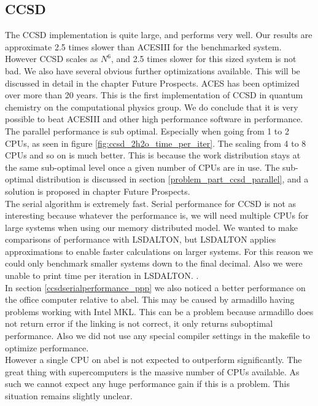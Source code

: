 \documentclass[a4paper,norsk,11pt,twoside]{report}
\begin{document}
\subsection{CCSD}
The CCSD implementation is quite large, and performs very well. Our results are approximate 2.5 times slower than ACESIII for the benchmarked system. However CCSD scales as $N^6$, and 2.5 times slower for this sized system is not bad. We also have several obvious further optimizations available. This will be discussed in detail in the chapter Future Prospects. ACES has been optimized over more than 20 years. This is the first implementation of CCSD in quantum chemistry on the computational physics group. We do conclude that it is very possible to beat ACESIII and other high performance software in performance. \\

The parallel performance is sub optimal. Especially when going from 1 to 2 CPUs, as seen in figure \ref{fig:ccsd_2h2o_time_per_iter}. The scaling from 4 to 8 CPUs and so on is much better. This is because the work distribution stays at the same sub-optimal level once a given number of CPUs are in use. The sub-optimal distribution is discussed in section \ref{problem_part_ccsd_parallel}, and a solution is proposed in chapter Future Prospects. \\

The serial algorithm is extremely fast. Serial performance for CCSD is not as interesting because whatever the performance is, we will need multiple CPUs for large systems when using our memory distributed model. We wanted to make comparisons of performance with LSDALTON, but LSDALTON applies approximations to enable faster calculations on larger systems. For this reason we could only benchmark smaller systems down to the final decimal. Also we were unable to print time per iteration in LSDALTON. . \\

In section \ref{ccsdserialperformance_ppp} we also noticed a better performance on the office computer relative to abel. This may be caused by armadillo having problems working with Intel MKL. This can be a problem because armadillo does not return error if the linking is not correct, it only returns suboptimal performance. Also we did not use any special compiler settings in the makefile to optimize performance. \\

However a single CPU on abel is not expected to outperform significantly. The great thing with supercomputers is the massive number of CPUs available. As such we cannot expect any huge performance gain if this is a problem. This situation remains slightly unclear. \\
\end{document}
